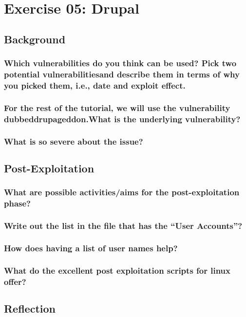 \section{Exercise 05: Drupal}

\subsection{Background}
\subsubsection{Which vulnerabilities do you think can be used? Pick two potential vulnerabilitiesand describe them in terms of why you picked them, i.e., date and exploit effect.}
\subsubsection{For the rest of the tutorial, we will use the vulnerability dubbeddrupageddon.What is the underlying vulnerability?}
\subsubsection{What is so severe about the issue?}

\subsection{Post-Exploitation}
\subsubsection{What are possible activities/aims for the post-exploitation phase?}
\subsubsection{Write out the list in the file that has the “User Accounts”?}
\subsubsection{How does having a list of user names help?}
\subsubsection{What do the excellent post exploitation scripts for linux offer?}

\subsection{Reflection}
